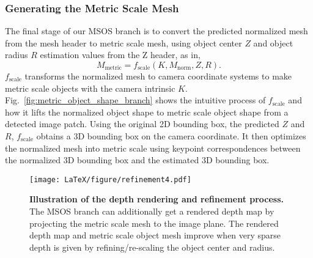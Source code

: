 \documentclass[letterpaper, 10 pt, journal, twoside]{IEEEtran}
\newcommand{\figref}[1]{Fig.~\ref{#1}}
\begin{document}
\subsubsection{Generating the Metric Scale Mesh}
\label{subsec:Z_header}
The final stage of our MSOS branch is to convert the predicted normalized mesh from the mesh header to metric scale mesh, using object center $Z$ and object radius $R$ estimation values from the Z header, as in,
\begin{equation}
    M_{\text{metric}} = f_{\text{scale}} (K, M_{\text{norm}}, Z, R).
\end{equation}
$f_{\text{scale}}$ transforms the normalized mesh to camera coordinate systems to make metric scale objects with the camera intrinsic $K$.
\figref{fig:metric_object_shape_branch} shows the intuitive process of $f_{\text{scale}}$ and how it lifts the normalized object shape to metric scale object shape from a detected image patch.
Using the original 2D bounding box, the predicted $Z$ and $R$, $f_{\text{scale}}$ obtains a 3D bounding box on the camera coordinate.
It then optimizes the normalized mesh into metric scale using keypoint correspondences between the normalized 3D bounding box and the estimated 3D bounding box.

\begin{figure}
\begin{center}
\texttt{[image: LaTeX/figure/refinement4.pdf]} 
\caption{\textbf{Illustration of the depth rendering and refinement process.} 
The MSOS branch can additionally get a rendered depth map by projecting the metric scale mesh to the image plane. 
The rendered depth map and metric scale object mesh improve when very sparse depth is given by refining/re-scaling the object center and radius.
}
\label{fig:metric_object_shape_refinement}
\end{center}
\vspace{-5mm}
\end{figure}
\end{document}
